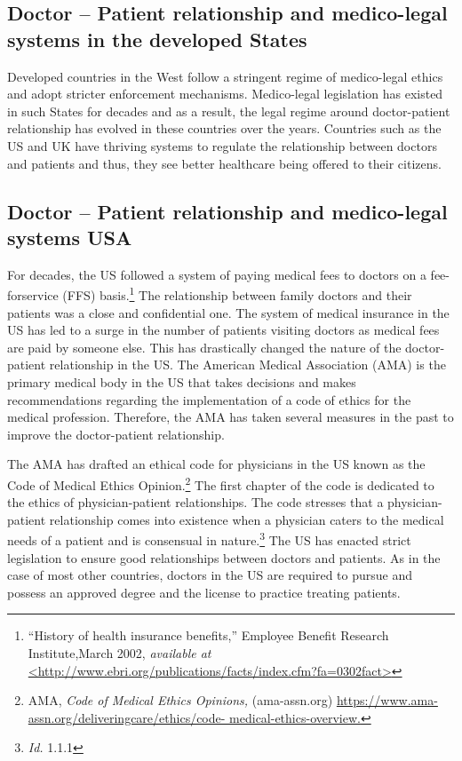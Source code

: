 \begin{multicols}{2}
\subsection*{Doctor – Patient relationship and medico-legal systems in the developed States}

\vspace{-.2cm}

\noi
Developed countries in the West follow a stringent regime of medico-legal ethics and adopt stricter enforcement mechanisms. Medico-legal legislation has existed in such States for decades and as a result, the legal regime around doctor-patient relationship has evolved in these countries over the years. Countries such as the US and UK have thriving systems to regulate the relationship between doctors and patients and thus, they see better healthcare being offered to their citizens.

\vspace{-.3cm}

\subsection*{Doctor – Patient relationship and medico-legal systems USA}

\vspace{-.2cm}

\noi
For decades, the US followed a system of paying medical fees to doctors on a fee-forservice (FFS) basis.\footnote{“History of health insurance benefits,” Employee Benefit Research Institute,March 2002, \textit{available at}  \url{<http://www.ebri.org/publications/facts/index.cfm?fa=0302fact>}} The relationship between family doctors and their patients was a close and confidential one. The system of medical insurance in the US has led to a surge in the number of patients visiting doctors as medical fees are paid by someone else. This has drastically changed the nature of the doctor-patient relationship in the US. The American Medical Association (AMA) is the primary medical body in the US that takes decisions and makes recommendations regarding the implementation of a code of ethics for the medical profession. Therefore, the AMA has taken several measures in the past to improve the doctor-patient relationship.

\noi
The AMA has drafted an ethical code for physicians in the US known as the Code of Medical Ethics Opinion.\footnote{AMA, \textit{Code of Medical Ethics Opinions,} (ama-assn.org)  \url{https://www.ama-assn.org/deliveringcare/ethics/code- medical-ethics-overview.}} The first chapter of the code is dedicated to the ethics of physician-patient relationships. The code stresses that a physician-patient relationship comes into existence when a physician caters to the medical needs of a patient and is consensual in nature.\footnote{\textit{Id.} 1.1.1} The US has enacted strict legislation to ensure good relationships between doctors and patients. As in the case of most other countries, doctors in the US are required to pursue and possess an approved degree and the license to practice treating patients.



\end{multicols}
